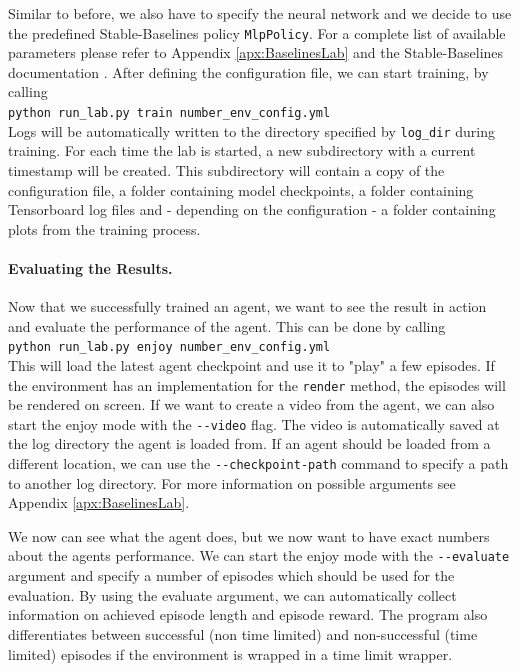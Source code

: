  Similar to before, we also have to specify the neural network and we decide to use the predefined Stable-Baselines policy \texttt{MlpPolicy}. For a complete list of available parameters please refer to Appendix \ref{apx:BaselinesLab} and the Stable-Baselines documentation \cite{stable-baselines-docs}. After defining the configuration file, we can start training, by calling \\ 

\texttt{python run\_lab.py train number\_env\_config.yml} \\ 

 \noindent Logs will be automatically written to the directory specified by \texttt{log\_dir} during training. For each time the lab is started, a new subdirectory with a current timestamp will be created. This subdirectory will contain a copy of the configuration file, a folder containing model checkpoints, a folder containing Tensorboard log files and - depending on the configuration - a folder containing plots from the training process. 

\paragraph{Evaluating the Results.}
Now that we successfully trained an agent, we want to see the result in action and evaluate the performance of the agent. This can be done by calling \\

\texttt{python run\_lab.py enjoy number\_env\_config.yml} \\

\noindent This will load the latest agent checkpoint and use it to "play" a few episodes. If the environment has an implementation for the \texttt{render} method, the episodes will be rendered on screen. If we want to create a video from the agent, we can also start the enjoy mode with the \texttt{-{}-video} flag. The video is automatically saved at the log directory the agent is loaded from. If an agent should be loaded from a different location, we can use the \texttt{-{}-checkpoint-path} command to specify a path to another log directory. For more information on possible arguments see Appendix \ref{apx:BaselinesLab}. 

We now can see what the agent does, but we now want to have exact numbers about the agents performance. We can start the enjoy mode with the \texttt{-{}-evaluate} argument and specify a number of episodes which should be used for the evaluation. By using the evaluate argument, we can automatically collect information on achieved episode length and episode reward. The program also differentiates between successful (non time limited) and non-successful (time limited) episodes if the environment is wrapped in a time limit wrapper.

